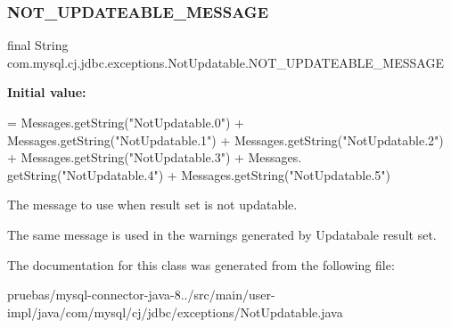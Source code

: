 \subsubsection{\texorpdfstring{N\+O\+T\+\_\+\+U\+P\+D\+A\+T\+E\+A\+B\+L\+E\+\_\+\+M\+E\+S\+S\+A\+GE}{NOT\_UPDATEABLE\_MESSAGE}}
{\footnotesize\ttfamily final String com.\+mysql.\+cj.\+jdbc.\+exceptions.\+Not\+Updatable.\+N\+O\+T\+\_\+\+U\+P\+D\+A\+T\+E\+A\+B\+L\+E\+\_\+\+M\+E\+S\+S\+A\+GE\hspace{0.3cm}{\ttfamily [static]}}

{\bfseries Initial value\+:}
\begin{DoxyCode}
= Messages.getString(\textcolor{stringliteral}{"NotUpdatable.0"}) + Messages.getString(\textcolor{stringliteral}{"NotUpdatable.1"})
            + Messages.getString(\textcolor{stringliteral}{"NotUpdatable.2"}) + Messages.getString(\textcolor{stringliteral}{"NotUpdatable.3"}) + Messages.
      getString(\textcolor{stringliteral}{"NotUpdatable.4"})
            + Messages.getString(\textcolor{stringliteral}{"NotUpdatable.5"})
\end{DoxyCode}
The message to use when result set is not updatable.

The same message is used in the warnings generated by Updatabale result set. 

The documentation for this class was generated from the following file\+:\begin{DoxyCompactItemize}
\item 
pruebas/mysql-\/connector-\/java-\/8../src/main/user-\/impl/java/com/mysql/cj/jdbc/exceptions/Not\+Updatable.\+java\end{DoxyCompactItemize}
